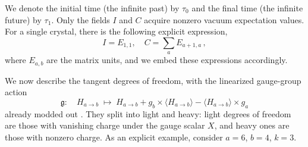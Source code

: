 \documentclass[10pt]{article}
\theoremstyle{definition}
\def\fg{\mathfrak{g}}
\def\lm{\limits}
\numberwithin{equation}{section}
\begin{document}
We denote the initial time (the infinite past) by $\tau_0$ and the final time (the infinite future) by $\tau_1$.
Only the fields $I$ and $C$ acquire nonzero vacuum expectation values.
For a single crystal, there is the following explicit expression,
\begin{equation}
	I=E_{1,1},\quad C=\sum\lm_{a}E_{a+1,a}\,,
\end{equation}
where $E_{a,b}$ are the matrix units, and we embed these expressions accordingly.

We now describe the tangent degrees of freedom, with the linearized gauge-group action
\begin{equation}\label{gauge}
	\fg:\quad H_{a\to b}\;\mapsto\; H_{a\to b}+g_b\times\langle H_{a\to b}\rangle-\langle H_{a\to b}\rangle\times g_a
\end{equation}
already modded out \cite{Galakhov:2024bzs}.
They split into light and heavy: light degrees of freedom are those with vanishing charge under the gauge scalar $X$, and heavy ones are those with nonzero charge.
As an explicit example, consider $a=6$, $b=4$, $k=3$.
\end{document}
